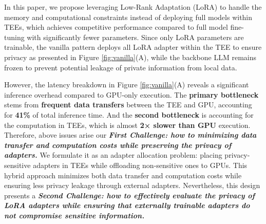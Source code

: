 \documentclass{article}
\begin{document}
In this paper, we propose leveraging Low-Rank Adaptation (LoRA) \cite{hu2022lora} to handle the memory and computational constraints instead of deploying full models within TEEs, which achieves competitive performance compared to full model fine-tuning with significantly fewer parameters\cite{zhu2024melo}. Since only LoRA parameters are trainable, the vanilla pattern deploys all LoRA adapter within the TEE to ensure privacy as presented in Figure \ref{fig:vanilla}(A), while the backbone LLM remains frozen to prevent potential leakage of private information from local data.

However, the latency breakdown in Figure \ref{fig:vanilla}(A) reveals a significant inference overhead compared to GPU-only execution. The \textbf{primary bottleneck} stems from \textbf{frequent data transfers} between the TEE and GPU, accounting for \textbf{41\%} of total inference time. And the \textbf{second bottleneck} is accounting for the computation in TEEs, which is almost \textbf{2× slower than GPU} execution. Therefore, above issues arise our \textit{\textbf{First Challenge: how to minimizing data transfer and computation costs while preserving the privacy of adapters.}} We formulate it as an adapter allocation problem: placing privacy-sensitive adapters in TEEs while offloading non-sensitive ones to GPUs. This hybrid approach minimizes both data transfer and computation costs while ensuring less privacy leakage through external adapters. Nevertheless, this design presents a \textbf{\textit{Second Challenge: how to effectively evaluate the privacy of LoRA adapters while ensuring that externally trainable adapters do not compromise sensitive information.}}
\end{document}
